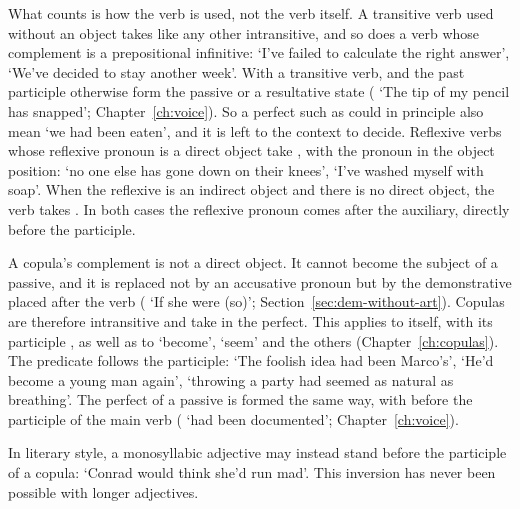 What counts is how the verb is used, not the verb itself. A transitive verb used without an object takes  like any other intransitive, and so does a verb whose complement is a prepositional infinitive:  `I've failed to calculate the right answer',  `We've decided to stay another week'. With a transitive verb,  and the past participle otherwise form the passive or a resultative state ( `The tip of my pencil has snapped'; Chapter~\ref{ch:voice}). So a perfect such as  could in principle also mean `we had been eaten', and it is left to the context to decide.
Reflexive verbs whose reflexive pronoun is a direct object take , with the pronoun in the object position:  `no one else has gone down on their knees',  `I've washed myself with soap'. When the reflexive is an indirect object and there is no direct object, the verb takes . In both cases the reflexive pronoun comes after the auxiliary, directly before the participle.

A copula's complement is not a direct object. It cannot become the subject of a passive, and it is replaced not by an accusative pronoun but by the demonstrative  placed after the verb ( `If she were (so)'; Section~\ref{sec:dem-without-art}). Copulas are therefore intransitive and take  in the perfect. This applies to  itself, with its participle , as well as to  `become',  `seem' and the others (Chapter~\ref{ch:copulas}). The predicate follows the participle:  `The foolish idea had been Marco's',  `He'd become a young man again',  `throwing a party had seemed as natural as breathing'. The perfect of a passive is formed the same way, with  before the participle of the main verb ( `had been documented'; Chapter~\ref{ch:voice}).

In literary style, a monosyllabic adjective may instead stand before the participle of a copula:  `Conrad would think she'd run mad'. This inversion has never been possible with longer adjectives.

